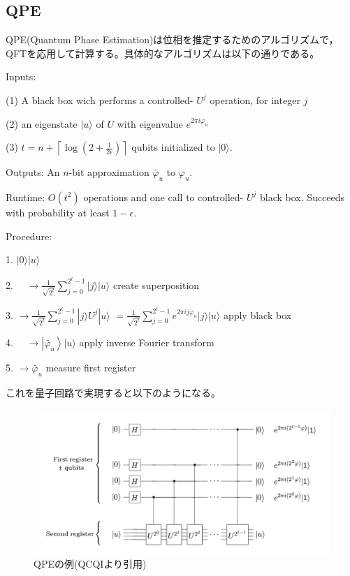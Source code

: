 \documentclass[b5paper,papersize,dvipdfmx,fleqn]{jsarticle}
\begin{document}
\subsection{QPE}
QPE(Quantum Phase Estimation)は位相を推定するためのアルゴリズムで，QFTを応用して計算する。具体的なアルゴリズムは以下の通りである。


Inputs:

 (1) A black box wich performs a controlled- $U^{j}$ operation, for integer $j$

 (2) an eigenstate $|u\rangle$ of $U$ with eigenvalue $e^{2 \pi i \varphi_{u}}$

 (3) $t=n+\left\lceil\log \left(2+\frac{1}{2 \epsilon}\right)\right\rceil$ qubits initialized to $|0\rangle$.


Outputs: An $n$-bit approximation $\widetilde{\varphi_{u}}$ to $\varphi_{u} .$


Runtime: $O\left(t^{2}\right)$ operations and one call to controlled- $U^{j}$ black box. Succeeds with probability at least $1-\epsilon$.


Procedure:


1. $|0\rangle|u\rangle$


2. $\quad \rightarrow \frac{1}{\sqrt{2^{t}}} \sum_{j=0}^{2^{t}-1}|j\rangle|u\rangle$ create superposition


3. $\rightarrow \frac{1}{\sqrt{2^{t}}} \sum_{j=0}^{2^{t}-1}|j\rangle U^{j}|u\rangle$ $=\frac{1}{\sqrt{2^{t}}} \sum_{j=0}^{2^{t}-1} e^{2 \pi i j \varphi_{u}}|j\rangle|u\rangle$ apply black box


4. $\quad \rightarrow\left|\widetilde{\varphi_{u}}\right\rangle|u\rangle$ apply inverse Fourier transform


5. $\rightarrow \widetilde{\varphi_{u}}$ measure first register

これを量子回路で実現すると以下のようになる。
\begin{center}
  \begin{figure}[H]
       \includegraphics[width=\textwidth]{qpe.pdf}
       \caption{QPEの例(QCQIより引用)}
       \label{circuit}
  \end{figure}
\end{center}
\end{document}

